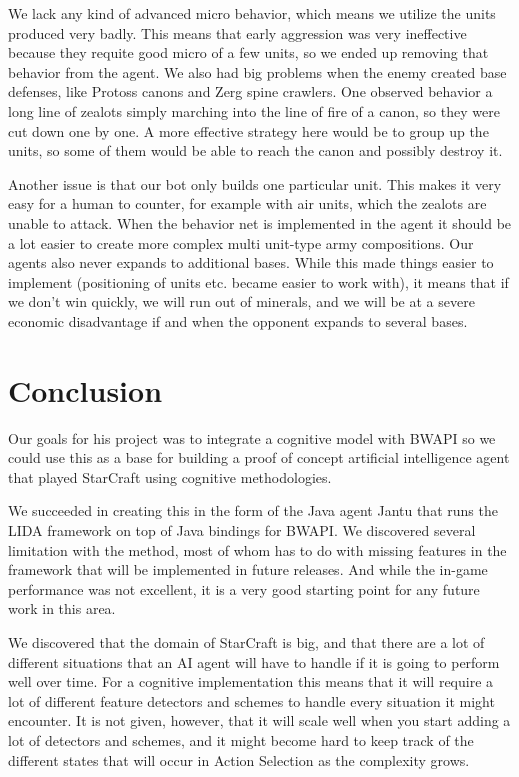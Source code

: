 We lack any kind of advanced micro behavior, which means we utilize the units produced very badly. This means that early aggression was very ineffective because they requite good micro of a few units, so we ended up removing that behavior from the agent. We also had big problems when the enemy created base defenses, like Protoss canons and Zerg spine crawlers. One observed behavior a long line of zealots simply marching into the line of fire of a canon, so they were cut down one by one. A more effective strategy here would be to group up the units, so some of them would be able to reach the canon and possibly destroy it.

Another issue is that our bot only builds one particular unit. This makes it very easy for a human to counter, for example with air units, which the zealots are unable to attack. When the behavior net is implemented in the agent it should be a lot easier to create more complex multi unit-type army compositions.
Our agents also never expands to additional bases. While this made things easier to implement (positioning of units etc. became easier to work with), it means that if we don't win quickly, we will run out of minerals, and we will be at a severe economic disadvantage if and when the opponent expands to several bases.

\section{Conclusion}
\label{sec:conclusion}
Our goals for his project was to integrate a cognitive model with BWAPI so we could use this as a base for building a proof of concept artificial intelligence agent that played StarCraft using cognitive methodologies.

We succeeded in creating this in the form of the Java agent Jantu that runs the LIDA framework on top of Java bindings for BWAPI. We discovered several limitation with the method, most of whom has to do with missing features in the framework that will be implemented in future releases. And while the in-game performance was not excellent, it is a very good starting point for any future work in this area.

We discovered that the domain of StarCraft is big, and that there are a lot of different situations that an AI agent will have to handle if it is going to perform well over time. For a cognitive implementation this means that it will require a lot of different feature detectors and schemes to handle every situation it might encounter. It is not given, however, that it will scale well when you start adding a lot of detectors and schemes, and it might become hard to keep track of the different states that will occur in Action Selection as the complexity grows.

